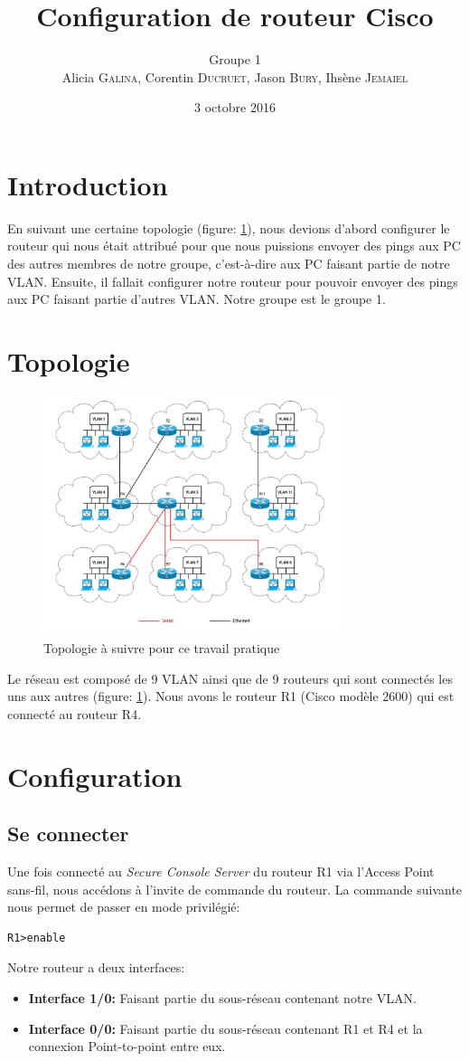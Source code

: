 \documentclass[a4paper,10pt]{article}
\title{Configuration de routeur Cisco}
\author{Groupe 1\\Alicia \textsc{Galina}, Corentin \textsc{Ducruet}, Jason \textsc{Bury}, Ihsène \textsc{Jemaiel}}
\date{3 octobre 2016}
\begin{document}
\maketitle

\section{Introduction}
En suivant une certaine topologie (figure: \ref{fig:topo}),
nous devions d'abord configurer le routeur qui nous était attribué pour que nous puissions envoyer des pings aux PC des autres membres de notre groupe,
c'est-à-dire aux PC faisant partie de notre VLAN.
Ensuite, il fallait configurer notre routeur pour pouvoir envoyer des pings aux PC faisant partie d'autres VLAN.
Notre groupe est le groupe 1.

\section{Topologie}
\begin{figure}[!h]
 \centering
 \includegraphics[height=7cm]{topo.jpg}
 \caption{Topologie à suivre pour ce travail pratique}
 \label{fig:topo}
\end{figure}%
Le réseau est composé de 9 VLAN ainsi que de 9 routeurs qui sont connectés les uns aux autres (figure: \ref{fig:topo}). Nous avons le routeur R1 (Cisco modèle 2600) qui est connecté au routeur R4.

\section{Configuration}
\subsection{Se connecter}
Une fois connecté au \textit{Secure Console Server} du routeur R1 via l'Access Point sans-fil, nous accédons à l'invite de commande du routeur.
La commande suivante nous permet de passer en mode privilégié:
\begin{verbatim}
R1>enable
\end{verbatim}
Notre routeur a deux interfaces:
\begin{itemize}
 \item \textbf{Interface 1/0:} Faisant partie du sous-réseau contenant notre VLAN.
 \item \textbf{Interface 0/0:} Faisant partie du sous-réseau contenant R1 et R4 et la connexion Point-to-point entre eux.
\end{itemize}
\end{document}
